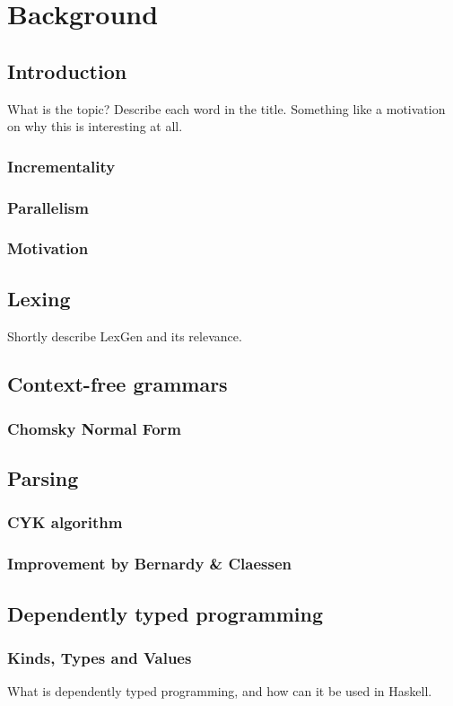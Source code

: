 \chapter{Background}

\section{Introduction}
What is the topic? Describe each word in the title. Something like a motivation on why this is interesting at all.
\subsection{Incrementality}
\subsection{Parallelism}
\subsection{Motivation}

\section{Lexing}
Shortly describe LexGen and its relevance.

\section{Context-free grammars}
\subsection{Chomsky Normal Form}

\section{Parsing}
\subsection{CYK algorithm}
\subsection{Improvement by Bernardy \& Claessen}

\section{Dependently typed programming}
\subsection{Kinds, Types and Values}
What is dependently typed programming, and how can it be used in Haskell.


